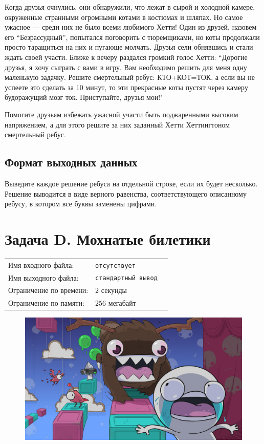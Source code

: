 \documentclass[12pt]{scrartcl}
\newcommand{\inputFile}{отсутствует}
\newcommand{\outputFile}{стандартный вывод}
\begin{document}
Когда друзья очнулись, они обнаружили, что лежат в сырой и холодной камере, окруженные странными огромными котами в костюмах и шляпах. Но самое ужасное --- среди них не было всеми любимого Хетти!
Один из друзей, назовем его ``Безрассудный'', попытался поговорить с тюремщиками, но коты продолжали просто таращиться на них и пугающе молчать. Друзья сели обнявшись и стали ждать своей участи. 
Ближе к вечеру раздался громкий голос Хетти: ``Дорогие друзья, я хочу сыграть с вами в игру. Вам необходимо решить для меня одну маленькую задачку. Решите смертельный ребус: КТО+КОТ=ТОК, 
а если вы не успеете это сделать за 10 минут, то эти прекрасные коты пустят через камеру будоражущий мозг ток. Приступайте, друзья мои!'

Помогите друзьям избежать ужасной участи быть поджаренными высоким напряжением, а для этого решите за них заданный Хетти Хеттингтоном смертельный ребус.

\subsection*{Формат выходных данных}
Выведите каждое решение ребуса на отдельной строке, если их будет несколько.
Решение выводится в виде верного равенства, соответствующего описанному ребусу,
в котором все буквы заменены цифрами.
 
\newpage

\section*{Задача D. Мохнатые билетики}

\begin{tabularx}{\textwidth}{l l X}
    Имя входного файла: & \texttt{\inputFile} \\
    Имя выходного файла: & \texttt{\outputFile} \\
    Ограничение по времени: & $2$ секунды \\
    Ограничение по памяти: & $256$ мегабайт \\
\end{tabularx}

\begin{figure}[h]
	\centering
    \includegraphics[width=0.8\linewidth]{tickets}
\end{figure}
\end{document}
